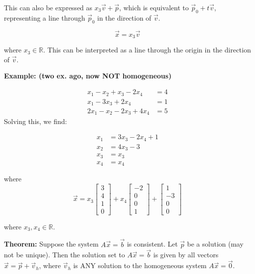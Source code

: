 \documentclass{article}
\begin{document}
This can also be expressed as \(x_3\vec{v} + \vec{p} \), which is equivalent to \(\vec{p}_0 + t\vec{v}\), representing a line through \(\vec{p}_0\) in the direction of \(\vec{v}\).



\[
\vec{x} = x_3 \vec{v}
\]

where \(x_3 \in \mathbb{R}\). This can be interpreted as a line through the origin in the direction of \(\vec{v}\).


\textbf{Example: (two ex. ago, now NOT homogeneous)}

\[
\begin{aligned}
    x_1 - x_2 + x_3 - 2x_4 &= 4 \\
    x_1 - 3x_3 + 2x_4 &= 1 \\
    2x_1 - x_2 - 2x_3 + 4x_4 &= 5
\end{aligned}
\]
Solving this, we find:

\[
\begin{aligned}
    x_1 &= 3x_3 - 2x_4 + 1 \\
    x_2 &= 4x_3 - 3 \\
    x_3 &= x_3 \\
    x_4 &= x_4
\end{aligned}
\]

where 
\[
\vec{x} = 
 x_3
\begin{bmatrix}
    3 \\
    4 \\
    1 \\
    0
\end{bmatrix}
+ x_4
\begin{bmatrix}
    -2 \\
    0 \\
    0  \\
    1
\end{bmatrix}
+
\begin{bmatrix}
    1 \\
    -3 \\
    0  \\
    0
\end{bmatrix}
\]

where \(x_3, x_4 \in \mathbb{R}\).

\textbf{Theorem:} Suppose the system \(A\vec{x} = \vec{b}\) is consistent. Let \(\vec{p}\) be a solution (may not be unique). Then the solution set to \(A\vec{x} = \vec{b}\) is given by all vectors \(\vec{x} = \vec{p} + \vec{v}_h\), where \(\vec{v}_h\) is ANY solution to the homogeneous system \(A\vec{x} = \vec{0}\).
\end{document}
